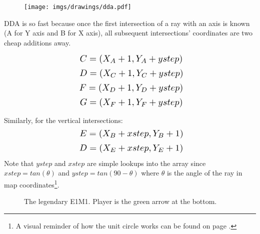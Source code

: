  \par
\begin{figure}[H]
  \centering
 \texttt{[image: imgs/drawings/dda.pdf]}
\end{figure}
\par


DDA is so fast because once the first intersection of a ray with an axis is known (A for Y axis and B for X axis), all subsequent intersections' coordinates are two cheap additions away.
\par


\begin{equation*}
    \scalebox{1.3}{
$C = (X_{A} +1, Y_{A} + ystep)$\\
}
\end{equation*}
\begin{equation*}
    \scalebox{1.3}{
$D = (X_{C} +1, Y_{C} + ystep)$\\
}
\end{equation*}
\begin{equation*}
    \scalebox{1.3}{
$F = (X_{D} +1, Y_{D} + ystep)$\\
}
\end{equation*}
\begin{equation*}
    \scalebox{1.3}{
$G = (X_{F} +1, Y_{F} + ystep)$\\
}
\end{equation*}


\par
Similarly, for the vertical intersections:\\
  \begin{equation*}
    \scalebox{1.3}{

$E = (X_{B} + xstep, Y_{B} + 1)$\\
}
\end{equation*}
  \begin{equation*}
    \scalebox{1.3}{
$D = (X_{E} + xstep, Y_{E} + 1)$\\
}
\end{equation*}
Note that $ystep$ and $xstep$ are simple lookups into the  array since $xstep=tan(\theta)$ and $ystep=tan(90-\theta)$ where $\theta$ is the angle of the ray in map coordinates\footnote{A visual reminder of how the unit circle works can be found on page \pageref{unit_circle}.}.\\
\par
\begin{figure}[H]
  \centering
 \label{mape1m1}
 \caption{The legendary E1M1. Player is the green arrow at the bottom.}
\end{figure}


